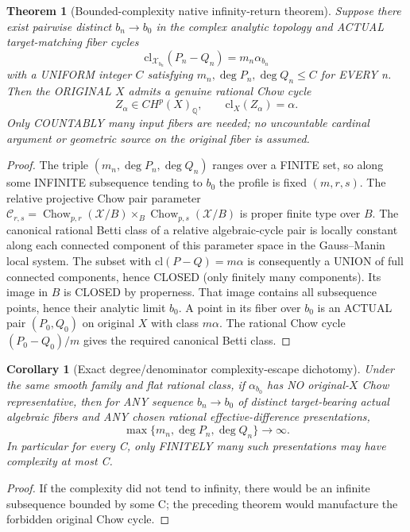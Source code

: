 \documentclass{article}
\newtheorem{theorem}{Theorem}
\newtheorem{corollary}{Corollary}
\begin{document}
\begin{theorem}[Bounded-complexity native infinity-return theorem]
Suppose there exist pairwise distinct $b_n\to b_0$ in the complex analytic topology and ACTUAL target-matching fiber cycles
\[
\mathrm{cl}_{\mathcal X_{b_n}}(P_n-Q_n)=m_n\alpha_{b_n}
\]
with a UNIFORM integer $C$ satisfying
$m_n,\deg P_n,\deg Q_n\le C$ for EVERY n.
Then the ORIGINAL $X$ admits a genuine rational Chow cycle
\[
\boxed{Z_\alpha\in CH^p(X)_{\mathbb Q},\qquad \mathrm{cl}_X(Z_\alpha)=\alpha.}
\]
Only COUNTABLY many input fibers are needed; no uncountable cardinal argument or geometric source on the original fiber is assumed.
\end{theorem}
\begin{proof}
The triple $(m_n,\deg P_n,\deg Q_n)$ ranges over a FINITE set, so along some INFINITE subsequence tending to $b_0$ the profile is fixed $(m,r,s)$.
The relative projective Chow pair parameter $\mathcal C_{r,s}=\operatorname{Chow}_{p,r}(\mathcal X/B)\times_B\operatorname{Chow}_{p,s}(\mathcal X/B)$ is proper finite type over $B$.
The canonical rational Betti class of a relative algebraic-cycle pair is locally constant along each connected component of this parameter space in the Gauss--Manin local system.
The subset with $\mathrm{cl}(P-Q)=m\alpha$ is consequently a UNION of full connected components, hence CLOSED (only finitely many components).
Its image in $B$ is CLOSED by properness. That image contains all subsequence points, hence their analytic limit $b_0$.
A point in its fiber over $b_0$ is an ACTUAL pair $(P_0,Q_0)$ on original $X$ with class $m\alpha$.
The rational Chow cycle $(P_0-Q_0)/m$ gives the required canonical Betti class.
\end{proof}

\begin{corollary}[Exact degree/denominator complexity-escape dichotomy]
Under the same smooth family and flat rational class, if $\alpha_{b_0}$ has NO original-$X$ Chow representative, then for ANY sequence $b_n\to b_0$ of distinct target-bearing actual algebraic fibers and ANY chosen rational effective-difference presentations,
\[
\boxed{\max\{m_n,\deg P_n,\deg Q_n\}\longrightarrow\infty.}
\]
In particular for every C, only FINITELY many such presentations may have complexity at most C.
\end{corollary}
\begin{proof}
If the complexity did not tend to infinity, there would be an infinite subsequence bounded by some C; the preceding theorem would manufacture the forbidden original Chow cycle.
\end{proof}
\end{document}

